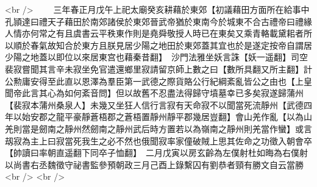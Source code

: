 <br />
　　三年春正月戊午上祀太廟癸亥耕藉於東郊【初議藉田方面所在給事中孔頴達曰禮天子藉田於南郊諸侯於東郊晉武帝猶於東南今於城東不合古禮帝曰禮緣人情亦何常之有且虞書云平秩東作則是堯舜敬授人時已在東矣又乘青輅載黛耜者所以順於春氣故知合於東方且朕見居少陽之地田於東郊蓋其宜也於是遂定按帝自謂居少陽之地蓋以即位以來居東宫也藉秦昔翻】　沙門法雅坐妖言誅【妖一遥翻】司空裴寂嘗聞其言辛未寂坐免官遣還鄉里寂請留京師上數之曰【數所具翻又所主翻】計公勲庸安得至此直以恩澤為羣臣第一武德之際貨賂公行紀綱紊亂皆公之由也【上皇聞帝此言其心為如何紊音問】但以故舊不忍盡法得歸守墳墓幸已多矣寂遂歸蒲州【裴寂本蒲州桑泉人】未幾又坐狂人信行言寂有天命寂不以聞當死流靜州【武德四年以始安郡之龍平豪靜蒼梧郡之蒼梧置靜州靜平郡幾居豈翻】會山羌作亂【以為山羌則當是劒南之靜州然劒南之靜州武后時方置若以為嶺南之靜州則羌當作蠻】或言刼寂為主上曰寂當死我生之必不然也俄聞寂率家僮破賊上思其佐命之功徵入朝會卒【帥讀曰率朝直遥翻下同卒子恤翻】　二月戊寅以房玄齡為左僕射杜如晦為右僕射以尚書右丞魏徵守祕書監參預朝政三月己酉上錄繫囚有劉恭者頸有勝文自云當勝<br />
<br />
